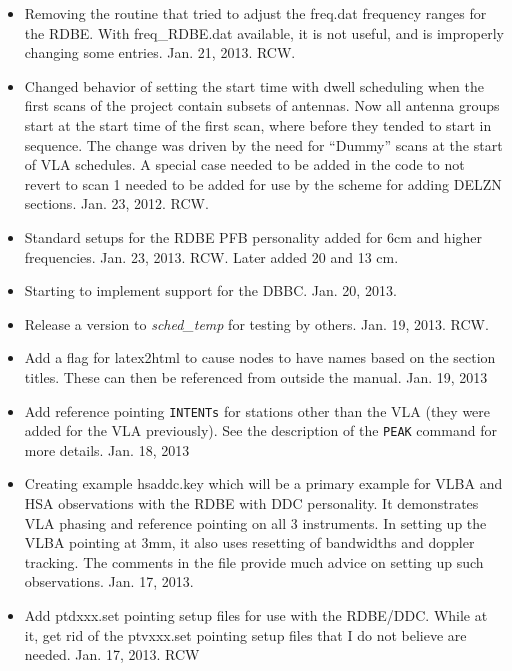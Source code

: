 \documentclass{report}
\begin{document}
\begin{itemize}
\item Removing the routine that tried to adjust the freq.dat frequency
ranges for the RDBE.  With freq\_RDBE.dat available, it is not useful,
and is improperly changing some entries.  Jan. 21, 2013.  RCW.

\item Changed behavior of setting the start time with dwell scheduling
when the first scans of the project contain subsets of antennas.  Now
all antenna groups start at the start time of the first scan, where
before they tended to start in sequence.  The change was driven by the
need for ``Dummy'' scans at the start of VLA schedules.  A special
case needed to be added in the code to not revert to scan 1 needed to
be added for use by the scheme for adding DELZN sections.  Jan. 23,
2012. RCW.

\item Standard setups for the RDBE PFB personality added for 6cm and 
higher frequencies.  Jan. 23, 2013. RCW.  Later added 20 and 13 cm.

\item Starting to implement support for the DBBC.  Jan. 20, 2013.

\item Release a version to {\sl sched\_temp} for testing by others.  
Jan. 19, 2013. RCW.

\item Add a flag for latex2html to cause nodes to have names based on the
section titles.  These can then be referenced from outside the manual.
Jan. 19, 2013

\item Add reference pointing {\tt INTENTs} for stations other than the
VLA (they were added for the VLA previously).  See the description
of the {\tt PEAK} command for more details.    Jan. 18, 2013

\item Creating example hsaddc.key which will be a primary example for
VLBA and HSA observations with the RDBE with DDC personality.  It 
demonstrates VLA phasing and reference pointing on all 3 instruments.
In setting up the VLBA pointing at 3mm, it also uses resetting of
bandwidths and doppler tracking.  The comments in the file provide
much advice on setting up such observations.  Jan. 17, 2013.

\item Add ptdxxx.set pointing setup files for use with the RDBE/DDC.
While at it, get rid of the ptvxxx.set pointing setup files that I do not
believe are needed.  Jan. 17, 2013.  RCW


\end{itemize}
\end{document}
